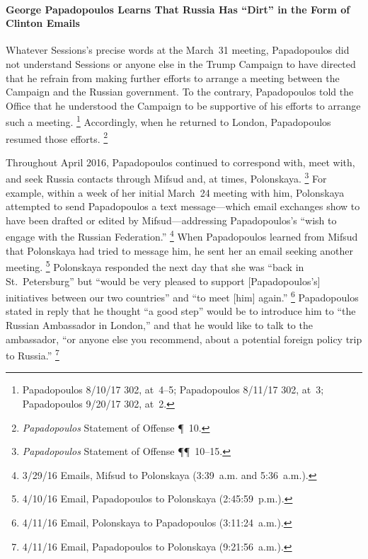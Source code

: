 \paragraph{George Papadopoulos Learns That Russia Has ``Dirt'' in the Form of Clinton Emails}

Whatever Sessions's precise words at the March~31 meeting, Papadopoulos did not understand Sessions or anyone else in the Trump Campaign to have directed that he refrain from making further efforts to arrange a meeting between the Campaign and the Russian government.
To the contrary, Papadopoulos told the Office that he understood the Campaign to be supportive of his efforts to arrange such a meeting.%
\footnote{Papadopoulos 8/10/17 302, at~4--5; Papadopoulos 8/11/17 302, at~3; Papadopoulos 9/20/17 302, at~2.}
Accordingly, when he returned to London, Papadopoulos resumed those efforts.%
\footnote{\textit{Papadopoulos} Statement of Offense \P~10.}

Throughout April 2016, Papadopoulos continued to correspond with, meet with, and seek Russia contacts through Mifsud and, at times, Polonskaya.%
\footnote{\textit{Papadopoulos} Statement of Offense \P\P~10--15.}
For example, within a week of her initial March~24 meeting with him, Polonskaya attempted to send Papadopoulos a text message---which email exchanges show to have been drafted or edited by Mifsud---addressing Papadopoulos's ``wish to engage with the Russian Federation.''%
\footnote{3/29/16 Emails, Mifsud to Polonskaya (3:39~a.m. and 5:36~a.m.).}
When Papadopoulos learned from Mifsud that Polonskaya had tried to message him, he sent her an email seeking another meeting.%
\footnote{4/10/16 Email, Papadopoulos to Polonskaya (2:45:59~p.m.).}
Polonskaya responded the next day that she was ``back in St.~Petersburg'' but ``would be very pleased to support [Papadopoulos's] initiatives between our two countries'' and ``to meet [him] again.''%
\footnote{4/11/16 Email, Polonskaya to Papadopoulos (3:11:24~a.m.).}
Papadopoulos stated in reply that he thought ``a good step'' would be to introduce him to ``the Russian Ambassador in London,'' and that he would like to talk to the ambassador, ``or anyone else you recommend, about a potential foreign policy trip to Russia.''%
\footnote{4/11/16 Email, Papadopoulos to Polonskaya (9:21:56~a.m.).}

